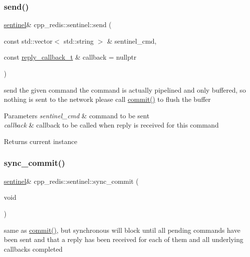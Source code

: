 \subsubsection{\texorpdfstring{send()}{send()}}
{\footnotesize\ttfamily \hyperlink{classcpp__redis_1_1sentinel}{sentinel}\& cpp\+\_\+redis\+::sentinel\+::send (\begin{DoxyParamCaption}\item[{const std\+::vector$<$ std\+::string $>$ \&}]{sentinel\+\_\+cmd,  }\item[{const \hyperlink{classcpp__redis_1_1sentinel_ae1a150ff8787208c47414397a061c9a7}{reply\+\_\+callback\+\_\+t} \&}]{callback = {\ttfamily nullptr} }\end{DoxyParamCaption})}

send the given command the command is actually pipelined and only buffered, so nothing is sent to the network please call \hyperlink{classcpp__redis_1_1sentinel_ad4f85d486499f82225b244f85091b31e}{commit()} to flush the buffer


\begin{DoxyParams}{Parameters}
{\em sentinel\+\_\+cmd} & command to be sent \\
\hline
{\em callback} & callback to be called when reply is received for this command \\
\hline
\end{DoxyParams}
\begin{DoxyReturn}{Returns}
current instance 
\end{DoxyReturn}
\mbox{\label{classcpp__redis_1_1sentinel_a8e4d231ac89510c337fe97fe9e642785}} 
\subsubsection{\texorpdfstring{sync\+\_\+commit()}{sync\_commit()}\hspace{0.1cm}{\footnotesize\ttfamily [1/2]}}
{\footnotesize\ttfamily \hyperlink{classcpp__redis_1_1sentinel}{sentinel}\& cpp\+\_\+redis\+::sentinel\+::sync\+\_\+commit (\begin{DoxyParamCaption}\item[{void}]{ }\end{DoxyParamCaption})}

same as \hyperlink{classcpp__redis_1_1sentinel_ad4f85d486499f82225b244f85091b31e}{commit()}, but synchronous will block until all pending commands have been sent and that a reply has been received for each of them and all underlying callbacks completed

